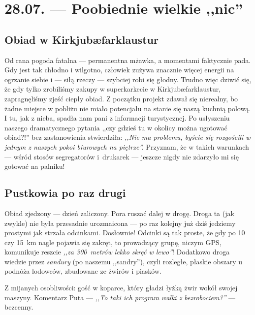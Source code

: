 \chapter*{28.07. --- Poobiednie wielkie ,,nic''}

\section*{Obiad w Kirkjubæfarklaustur}

Od rana pogoda fatalna --- permanentna mżawka, a momentami faktycznie pada. Gdy jest tak chłodno i wilgotno, człowiek zużywa znacznie więcej energii na ogrzanie siebie i --- siłą rzeczy --- szybciej robi się głodny. Trudno więc dziwić się, że gdy tylko zrobiliśmy zakupy w superkarkecie w Kirkjubæfarklaustur, zapragnęliśmy zjeść ciepły obiad. Z początku projekt zdawał się nierealny, bo żadne miejsce w pobliżu nie miało potencjału na stanie się naszą kuchnią polową. I tu, jak z nieba, spadła nam pani z informacji turystycznej. Po usłyszeniu naszego dramatycznego pytania ,,czy gdzieś tu w okolicy można ugotować obiad?!'' bez zastanowienia stwierdziła: \emph{,,Nie ma problemu, byście się rozgościli w jednym z naszych pokoi biurowych na piętrze''.} Przyznam, że w takich warunkach --- wśród stosów segregatorów i~drukarek --- jeszcze nigdy nie zdarzyło mi się gotować na palniku!


\section*{Pustkowia po raz drugi}

Obiad zjedzony --- dzień zaliczony. Pora ruszać dalej w drogę. Droga ta (jak zwykle) nie była przesadnie urozmaicona --- po raz kolejny już dziś jedziemy prostymi jak strzała odcinkami. Dosłownie! Odcinki są tak proste, że gdy po 10 czy 15~km nagle pojawia się zakręt, to prowadzący grupę, niczym GPS, komunikuje reszcie \emph{,,za 300~metrów lekko skręć w lewo''}! Dodatkowo droga wiedzie przez \emph{sandury} (po naszemu ,,sandry''), czyli rozległe, płaskie obszary u podnóża lodowców, zbudowane ze żwirów i piasków.

Z mijanych osobliwości: gość w koparce, który gładzi łyżką żwir wokół swojej maszyny. Komentarz Puta --- \emph{,,To taki ich program walki z bezrobociem?''} --- bezcenny.

